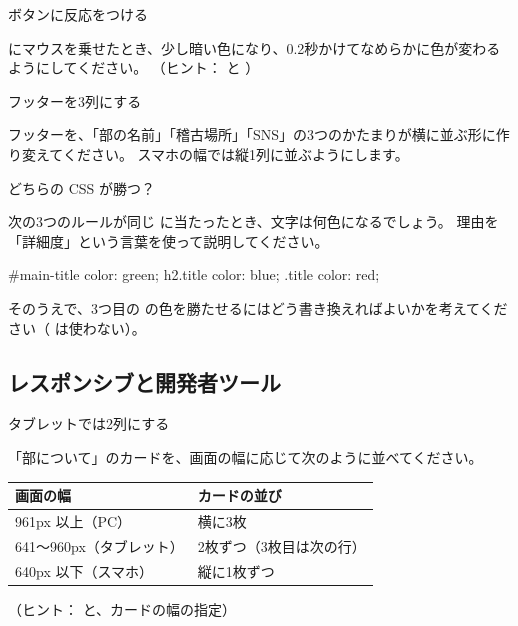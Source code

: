 \begin{exercise}[2]{ボタンに反応をつける}
\toanswer\par
{} にマウスを乗せたとき、少し暗い色になり、0.2秒かけてなめらかに色が変わるようにしてください。
（ヒント： と ）
\end{exercise}

\begin{exercise}[2]{フッターを3列にする}
\toanswer\par
フッターを、「部の名前」「稽古場所」「SNS」の3つのかたまりが横に並ぶ形に作り変えてください。
スマホの幅では縦1列に並ぶようにします。
\end{exercise}

\begin{exercise}[3]{どちらの CSS が勝つ？}
\toanswer\par
次の3つのルールが同じ  に当たったとき、文字は何色になるでしょう。
理由を「詳細度」という言葉を使って説明してください。
\begin{Piton}[language=code]
#main-title { color: green; }
h2.title    { color: blue; }
.title      { color: red; }
\end{Piton}
そのうえで、3つ目の  の色を勝たせるにはどう書き換えればよいかを考えてください（ は使わない）。
\end{exercise}

\subsection*{レスポンシブと開発者ツール}

\begin{exercise}[2]{タブレットでは2列にする}
\toanswer\par
「部について」のカードを、画面の幅に応じて次のように並べてください。
\begin{center}\small
\begin{tabular}{ll}\toprule
画面の幅 & カードの並び \\\midrule
961px 以上（PC） & 横に3枚 \\
641〜960px（タブレット） & 2枚ずつ（3枚目は次の行） \\
640px 以下（スマホ） & 縦に1枚ずつ \\\bottomrule
\end{tabular}
\end{center}
（ヒント： と、カードの幅の指定）
\end{exercise}

